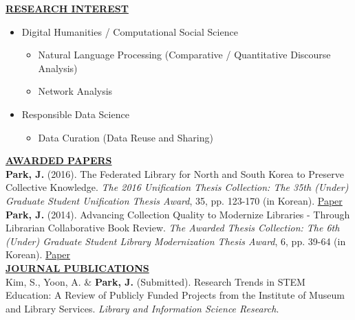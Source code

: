 \documentclass{article}
\begin{document}
\noindent \textbf{\underline{RESEARCH INTEREST}} 
\begin{itemize}[noitemsep,nolistsep,leftmargin=*]
\item {Digital Humanities / Computational Social Science}
\begin{itemize}
    \item {Natural Language Processing (Comparative / Quantitative Discourse Analysis)}
    \item {Network Analysis}
\end{itemize}
\item {Responsible Data Science}
    \begin{itemize}
        \item {Data Curation (Data Reuse and Sharing)}
    \end{itemize}
\end{itemize}

%
%
\noindent \textbf{\underline{AWARDED PAPERS}} \\
\noindent \textbf{Park, J.} (2016). The Federated Library for North and South Korea to Preserve Collective Knowledge. \textit{The 2016 Unification Thesis Collection: The 35th (Under) Graduate Student Unification Thesis Award}, 35, pp. 123-170 (in Korean). \hfill \href{https://uniedu.go.kr/uniedu/home/pds/pdsatcl/view.do?id=19773&mid=SM00000532&limit=20&sc=T&eqOdrby=false&eqViewYn=true&odr=news}{Paper}\\ 

\noindent \textbf{Park, J.} (2014). Advancing Collection Quality to Modernize Libraries - Through Librarian Collaborative Book Review. \textit{The Awarded Thesis Collection: The 6th (Under) Graduate Student Library Modernization Thesis Award}, 6, pp. 39-64 (in Korean). \hfill \href{https://oak.go.kr/nl-ir/handle/2020.oak/304}{Paper}\\

\noindent \textbf{\underline{JOURNAL PUBLICATIONS}} \\
\noindent Kim, S., Yoon, A. \& \textbf{Park, J.} (Submitted). Research Trends in STEM Education: A Review of Publicly Funded Projects from the Institute of Museum and Library Services. \textit{Library and Information Science Research}. \\
\end{document}
